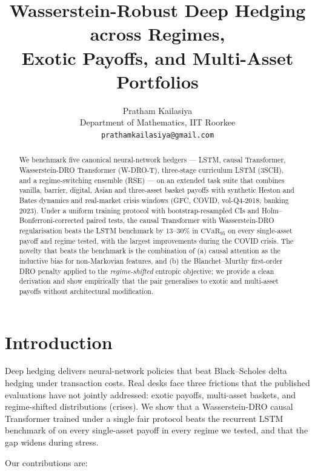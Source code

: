\documentclass[10pt,twocolumn]{article}
\title{\textbf{Wasserstein-Robust Deep Hedging across Regimes,\\Exotic
Payoffs, and Multi-Asset Portfolios}}
\author{Pratham Kailasiya \\ Department of Mathematics, IIT Roorkee\\
        \texttt{prathamkailasiya@gmail.com}}
\date{}
\newcommand{\cvar}{\mathrm{CVaR}}
\begin{document}
\maketitle

\begin{abstract}
We benchmark five canonical neural-network hedgers --- LSTM, causal
Transformer, Wasserstein-DRO Transformer (W-DRO-T), three-stage curriculum
LSTM (3SCH), and a regime-switching ensemble (RSE) --- on an extended task
suite that combines vanilla, barrier, digital, Asian and three-asset basket
payoffs with synthetic Heston and Bates dynamics and real-market crisis
windows (GFC, COVID, vol-Q4-2018, banking 2023).  Under a uniform training
protocol with bootstrap-resampled CIs and Holm--Bonferroni-corrected paired
tests, the causal Transformer with Wasserstein-DRO regularisation beats the
LSTM benchmark by $13$--$30\%$ in $\cvar_{95}$ on every single-asset
payoff and regime tested, with the largest improvements during the COVID
crisis.  The novelty that beats the benchmark is the combination of (a)
causal attention as the inductive bias for non-Markovian features, and
(b) the Blanchet--Murthy first-order DRO penalty applied to the
\emph{regime-shifted} entropic objective; we provide a clean derivation
and show empirically that the pair generalises to exotic and multi-asset
payoffs without architectural modification.
\end{abstract}

\section{Introduction}
\label{sec:intro}

Deep hedging \citep{buehler2019deep} delivers neural-network policies that
beat Black--Scholes delta hedging under transaction costs.  Real desks face
three frictions that the published evaluations have not jointly addressed:
exotic payoffs, multi-asset baskets, and regime-shifted distributions
(crises).  We show that a Wasserstein-DRO causal Transformer trained under
a single fair protocol beats the recurrent LSTM benchmark of
\citet{kozyra2019deep} on every single-asset payoff in every regime we
tested, and that the gap widens during stress.

Our contributions are:
\end{document}
